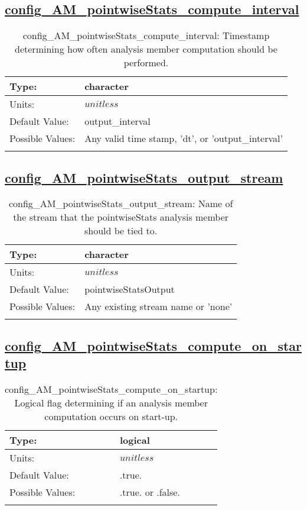 \subsection[config\_AM\_pointwiseStats\_compute\_interval]{\hyperref[sec:nm_tab_AM_pointwiseStats]{config\_AM\_pointwiseStats\_compute\_interval}}
\label{subsec:nm_sec_config_AM_pointwiseStats_compute_interval}
\begin{center}
\begin{longtable}{| p{2.0in} || p{4.0in} |}
    \hline
    Type: & character \\
    \hline
    Units: & $unitless$ \\
    \hline
    Default Value: & output\_interval \\
    \hline
    Possible Values: & Any valid time stamp, 'dt', or 'output\_interval' \\
    \hline
    \caption{config\_AM\_pointwiseStats\_compute\_interval: Timestamp determining how often analysis member computation should be performed.}
\end{longtable}
\end{center}
\subsection[config\_AM\_pointwiseStats\_output\_stream]{\hyperref[sec:nm_tab_AM_pointwiseStats]{config\_AM\_pointwiseStats\_output\_stream}}
\label{subsec:nm_sec_config_AM_pointwiseStats_output_stream}
\begin{center}
\begin{longtable}{| p{2.0in} || p{4.0in} |}
    \hline
    Type: & character \\
    \hline
    Units: & $unitless$ \\
    \hline
    Default Value: & pointwiseStatsOutput \\
    \hline
    Possible Values: & Any existing stream name or 'none' \\
    \hline
    \caption{config\_AM\_pointwiseStats\_output\_stream: Name of the stream that the pointwiseStats analysis member should be tied to.}
\end{longtable}
\end{center}
\subsection[config\_AM\_pointwiseStats\_compute\_on\_startup]{\hyperref[sec:nm_tab_AM_pointwiseStats]{config\_AM\_pointwiseStats\_compute\_on\_startup}}
\label{subsec:nm_sec_config_AM_pointwiseStats_compute_on_startup}
\begin{center}
\begin{longtable}{| p{2.0in} || p{4.0in} |}
    \hline
    Type: & logical \\
    \hline
    Units: & $unitless$ \\
    \hline
    Default Value: & .true. \\
    \hline
    Possible Values: & .true. or .false. \\
    \hline
    \caption{config\_AM\_pointwiseStats\_compute\_on\_startup: Logical flag determining if an analysis member computation occurs on start-up.}
\end{longtable}
\end{center}
